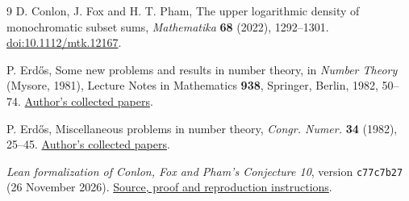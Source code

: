 \documentclass[11pt]{article}
\begin{document}
\begin{thebibliography}{9}
D. Conlon, J. Fox and H. T. Pham, The upper logarithmic density of
monochromatic subset sums, \emph{Mathematika} \textbf{68} (2022),
1292--1301. \href{https://doi.org/10.1112/mtk.12167}{doi:10.1112/mtk.12167}.

P. Erd\H{o}s, Some new problems and results in number theory,
in \emph{Number Theory} (Mysore, 1981), Lecture Notes in Mathematics
\textbf{938}, Springer, Berlin, 1982, 50--74.
\href{https://www.renyi.hu/~p_erdos/1982-32.pdf}{Author's collected papers}.

P. Erd\H{o}s, Miscellaneous problems in number theory, \emph{Congr. Numer.}
\textbf{34} (1982), 25--45.
\href{https://renyi.hu/~p_erdos/1982-08.pdf}{Author's collected papers}.

\emph{Lean formalization of Conlon, Fox and Pham's Conjecture 10},
version \texttt{c77c7b27} (26 November 2026).
\href{https://github.com/aliromman/math/tree/c77c7b27b242d8542ccc79c6454553536347dd9a/conjectures/CFPLogDensity}{Source, proof and reproduction instructions}.
\end{thebibliography}
\end{document}
